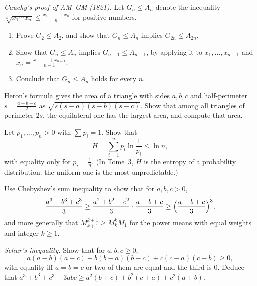 \begin{exercise}[$\star\star$]\label{ex:cauchyinduction}
\emph{Cauchy's proof of AM--GM (1821).} Let $G_n\le A_n$ denote the inequality $\sqrt[n]{x_1\cdots x_n}\le\frac{x_1+\dots+x_n}n$ for positive numbers.
\begin{enumerate}[label=(\alph*)]
\item Prove $G_2\le A_2$, and show that $G_n\le A_n$ implies $G_{2n}\le A_{2n}$.
\item Show that $G_n\le A_n$ implies $G_{n-1}\le A_{n-1}$, by applying it to $x_1,\dots,x_{n-1}$ and $x_n=\frac{x_1+\dots+x_{n-1}}{n-1}$.
\item Conclude that $G_n\le A_n$ holds for every $n$.
\end{enumerate}
\end{exercise}

\begin{exercise}[$\star\star$]\label{ex:heron}
Heron's formula gives the area of a triangle with sides $a,b,c$ and half-perimeter $s=\frac{a+b+c}2$ as $\sqrt{s(s-a)(s-b)(s-c)}$. Show that among all
triangles of perimeter $2s$, the equilateral one has the largest area, and compute that area.
\end{exercise}

\begin{exercise}[$\star\star$]\label{ex:entropy}
Let $p_1,\dots,p_n>0$ with $\sum p_i=1$. Show that
\[
H=\sum_{i=1}^np_i\ln\frac1{p_i}\le\ln n,
\]
with equality only for $p_i=\frac1n$. (In Tome~3, $H$ is the entropy of a probability distribution: the uniform one is the most unpredictable.)
\end{exercise}

\begin{exercise}[$\star\star$]\label{ex:chebsumapp}
Use Chebyshev's sum inequality to show that for $a,b,c>0$,
\[
\frac{a^3+b^3+c^3}3\ge\frac{a^2+b^2+c^2}3\cdot\frac{a+b+c}3\ge\Bigl(\frac{a+b+c}3\Bigr)^3,
\]
and more generally that $M_{k+1}^{k+1}\ge M_k^kM_1$ for the power means with equal weights and integer $k\ge1$.
\end{exercise}

\begin{exercise}[$\star\star\star$]\label{ex:schur}
\emph{Schur's inequality.} Show that for $a,b,c\ge0$,
\[
a(a-b)(a-c)+b(b-a)(b-c)+c(c-a)(c-b)\ge0,
\]
with equality iff $a=b=c$ or two of them are equal and the third is $0$. Deduce that $a^3+b^3+c^3+3abc\ge a^2(b+c)+b^2(c+a)+c^2(a+b)$.
\end{exercise}

